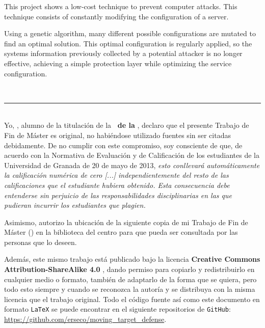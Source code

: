 {{\bigskip
This project shows a low-cost technique to prevent computer attacks. This technique consists of constantly modifying the configuration of a server.

\bigskip
Using a genetic algorithm, many different possible configurations are mutated to find an optimal solution. This optimal configuration is regularly applied, so the systems information previously collected by a potential attacker is no longer effective, achieving a simple protection layer while optimizing the service configuration.


\newpage
\thispagestyle{empty}
\
\vspace{10cm}

\noindent\rule[-1ex]{\textwidth}{2pt}\\[4.5ex]


Yo, \textbf{\autor}, alumno de la titulación \textbf{\master} de la \textbf{\escuela\ de la \universidad}, declaro que el presente Trabajo de Fin de Máster es original, no habiéndose utilizado fuentes sin ser citadas debidamente. De no cumplir con este compromiso, soy consciente de que, de acuerdo con la Normativa de Evaluación y de Calificación de los estudiantes de la Universidad de Granada de 20 de mayo de 2013, \textit{esto conllevará automáticamente la calificación numérica de cero [...] independientemente del resto de las calificaciones que el estudiante hubiera obtenido. Esta consecuencia debe entenderse sin perjuicio de las responsabilidades disciplinarias en las que pudieran incurrir los estudiantes que plagien.}

\bigskip
Asimismo, autorizo la ubicación de la siguiente copia de mi Trabajo de Fin de Máster (\textit{\titulo}) en la biblioteca del centro para que pueda ser consultada por las personas que lo deseen.

\bigskip
Además, este mismo trabajo está publicado bajo la licencia \textbf{Creative Commons Attribution-ShareAlike 4.0} \cite{CC}, dando permiso para copiarlo y redistribuirlo en cualquier medio o formato, también de adaptarlo de la forma que se quiera, pero todo esto siempre y cuando se reconozca la autoría y se distribuya con la misma licencia que el trabajo original. Todo el código fuente así como este documento en formato {\tt LaTeX} se puede encontrar en el siguiente repositorios de {\tt GitHub}: \url{https://github.com/erseco/moving_target_defense}.

}}
